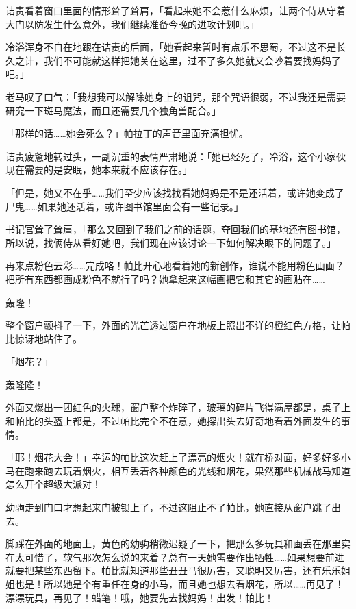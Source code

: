 诘责看着窗口里面的情形耸了耸肩，「看起来她不会惹什么麻烦，让两个侍从守着大门以防发生什么意外，我们继续准备今晚的进攻计划吧。」

冷浴浑身不自在地跟在诘责的后面，「她看起来暂时有点乐不思蜀，不过这不是长久之计，我们不可能就这样把她关在这里，过不了多久她就又会吵着要找妈妈了吧。」

老马叹了口气：「我想我可以解除她身上的诅咒，那个咒语很弱，不过我还是需要研究一下斑马魔法，而且还需要几个独角兽配合。」

「那样的话……她会死么？」帕拉丁的声音里面充满担忧。

诘责疲惫地转过头，一副沉重的表情严肃地说：「她已经死了，冷浴，这个小家伙现在需要的是安眠，她本来就不应该存在。」

「但是，她又不在乎……我们至少应该找找看她妈妈是不是还活着，或许她变成了尸鬼……如果她还活着，或许图书馆里面会有一些记录。」

书记官耸了耸肩，「那么又回到了我们之前的话题，夺回我们的基地还有图书馆，所以说，找俩侍从看好她吧，我们现在应该讨论一下如何解决眼下的问题了。」

\horizonline


再来点粉色云彩……完成咯！帕比开心地看着她的新创作，谁说不能用粉色画画？把所有东西都画成粉色不就行了吗？她拿起来这幅画把它和其它的画贴在……{}

轰隆！

整个窗户颤抖了一下，外面的光芒透过窗户在地板上照出不详的橙红色方格，让帕比惊讶地站住了。

「烟花？」

轰隆隆！

外面又爆出一团红色的火球，窗户整个炸碎了，玻璃的碎片飞得满屋都是，桌子上和帕比的头盔上都是，不过帕比完全不在意，她探出头去好奇地看着外面发生的事情。

「耶！烟花大会！」幸运的帕比这次赶上了漂亮的烟火！就在桥对面，好多好多小马在跑来跑去玩着烟火，相互丢着各种颜色的光线和烟花，果然那些机械战马知道怎么开个超级大派对！

幼驹走到门口才想起来门被锁上了，不过这阻止不了帕比，她直接从窗户跳了出去。

脚踩在外面的地面上，黄色的幼驹稍微迟疑了一下，把那么多玩具和画丢在那里实在太可惜了，软气那次怎么说的来着？总有一天她需要作出牺牲……如果想要前进就要把某些东西留下。帕比就知道那些丑丑马很厉害，又聪明又厉害，还有乐乐姐姐也是！所以她是个有重任在身的小马，而且她也想去看烟花，所以……再见了！漂漂玩具，再见了！蜡笔！哦，她要先去找妈妈！出发！帕比！

